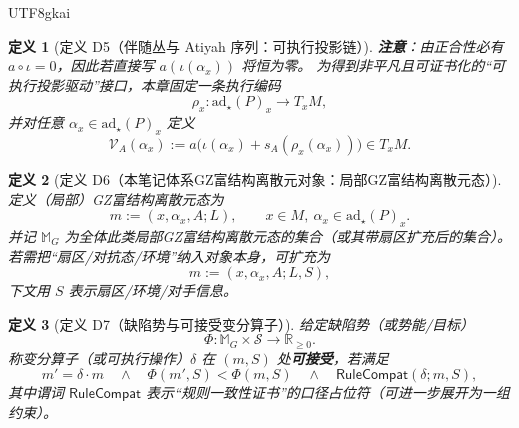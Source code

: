 \documentclass[12pt]{article}
\newtheorem{definition}{定义}[section]
\newcommand{\RR}{\mathbb{R}}
\newcommand{\GZMon}{\texorpdfstring{GZ富结构离散元}{GZ富结构离散元}}
\newcommand{\GZMonState}{\texorpdfstring{GZ富结构离散元态}{GZ富结构离散元态}}
\begin{document}
\begin{CJK*}{UTF8}{gkai}
\begin{definition}[定义 D5（伴随丛与 Atiyah 序列：可执行投影链）]
\textbf{注意}：由正合性必有 $a\circ\iota=0$，因此若直接写 $a(\iota(\alpha_x))$ 将恒为零。
为得到非平凡且可证书化的“可执行投影驱动”接口，本章固定一条执行编码
\[
  \rho_x:\mathrm{ad}_{\star}(P)_x\to T_xM,
\]
并对任意 $\alpha_x\in\mathrm{ad}_{\star}(P)_x$ 定义
\[
  \mathcal{V}_A(\alpha_x)
  :=a\bigl(\iota(\alpha_x)+s_A(\rho_x(\alpha_x))\bigr)
  \in T_xM.
\]
\end{definition}

\begin{definition}[定义 D6（本笔记体系\GZMon{}对象：局部\GZMonState{}）]
\label{def:tex29-category-cg-monad}
定义（局部）\GZMonState{}为
\[
  m:=(x,\alpha_x,A;L),
  \qquad
  x\in M,\ \alpha_x\in \mathrm{ad}_{\star}(P)_x.
\]
并记 $\mathbb{M}_G$ 为全体此类局部\GZMonState{}的集合（或其带扇区扩充后的集合）。
若需把“扇区/对抗态/环境”纳入对象本身，可扩充为
\[
  m:=(x,\alpha_x,A;L,S),
\]
下文用 $S$ 表示扇区/环境/对手信息。
\end{definition}

\begin{definition}[定义 D7（缺陷势与可接受变分算子）]
\label{def:tex29-category-cg-phi}
给定缺陷势（或势能/目标）
\[
  \Phi:\mathbb{M}_G\times\mathcal{S}\to\RR_{\ge 0}.
\]
称变分算子（或可执行操作）$\delta$ 在 $(m,S)$ 处\textbf{可接受}，若满足
\[
  m'=\delta\cdot m
  \quad\wedge\quad
  \Phi(m',S)<\Phi(m,S)
  \quad\wedge\quad
  \mathsf{RuleCompat}(\delta;m,S),
\]
其中谓词 $\mathsf{RuleCompat}$ 表示“规则一致性证书”的口径占位符（可进一步展开为一组约束）。
\end{definition}


\end{CJK*}
\end{document}
